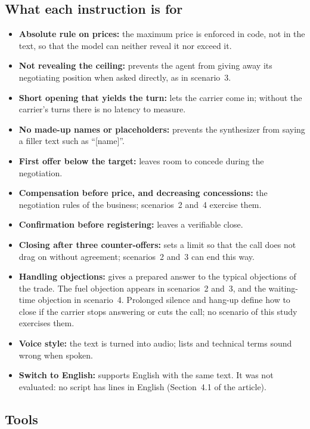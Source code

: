 \documentclass[11pt]{article}
\begin{document}
\subsection{What each instruction is for}
\begin{itemize}[leftmargin=1.4cm]
  \item \textbf{Absolute rule on prices:} the maximum price is enforced in code,
  not in the text, so that the model can neither reveal it nor exceed it.
  \item \textbf{Not revealing the ceiling:} prevents the agent from giving away its
  negotiating position when asked directly, as in scenario~3.
  \item \textbf{Short opening that yields the turn:} lets the carrier come in;
  without the carrier's turns there is no latency to measure.
  \item \textbf{No made-up names or placeholders:} prevents the synthesizer from
  saying a filler text such as ``[name]''.
  \item \textbf{First offer below the target:} leaves room to concede during the
  negotiation.
  \item \textbf{Compensation before price, and decreasing concessions:} the
  negotiation rules of the business; scenarios~2 and~4 exercise them.
  \item \textbf{Confirmation before registering:} leaves a verifiable close.
  \item \textbf{Closing after three counter-offers:} sets a limit so that the call
  does not drag on without agreement; scenarios~2 and~3 can end this way.
  \item \textbf{Handling objections:} gives a prepared answer to the typical
  objections of the trade. The fuel objection appears in scenarios~2 and~3, and
  the waiting-time objection in scenario~4. Prolonged silence and hang-up define
  how to close if the carrier stops answering or cuts the call; no scenario of
  this study exercises them.
  \item \textbf{Voice style:} the text is turned into audio; lists and technical
  terms sound wrong when spoken.
  \item \textbf{Switch to English:} supports English with the same text. It was not
  evaluated: no script has lines in English (Section~4.1 of the article).
\end{itemize}

\subsection{Tools}
\end{document}

